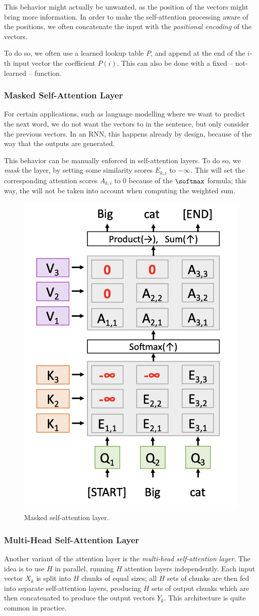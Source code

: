This behavior might actually be unwanted, as the position of the vectors might bring more information. In order to make the self-attention processing aware of the positions, we often concatenate the input with the \emph{positional encoding} of the vectors.

To do so, we often use a learned lookup table $P$, and append at the end of the $i$-th input vector the coefficient $P(i)$. This can also be done with a fixed -- not-learned -- function.

\subsubsection{Masked Self-Attention Layer}
For certain applications, such as language modelling where we want to predict the next word, we do not want the vectors to  in the sentence, but only consider the previous vectors. In an RNN, this happens already by design, because of the way that the outputs are generated.

This behavior can be manually enforced in self-attention layers. To do so, we \emph{mask} the layer, by setting some similarity scores $E_{k,i}$ to $-\infty$. This will set the corresponding attention scores $A_{k,i}$ to 0 because of the $\softmax$ formula; this way, the  will not be taken into account when computing the weighted sum.

\begin{figure}[H]
    \centering
    \includegraphics[width=.35\textwidth]{images/masked-attention.png}
    \caption{Masked self-attention layer.}
\end{figure}

\subsubsection{Multi-Head Self-Attention Layer}
Another variant of the attention layer is the \emph{multi-head self-attention layer}. The idea is to use $H$  in parallel, running $H$ attention layers independently. Each input vector $X_k$ is split into $H$ chunks of equal sizes; all $H$ sets of chunks are then fed into separate self-attention layers, producing $H$ sets of output chunks which are then concatenated to produce the output vectors $Y_k$. This architecture is quite common in practice.

